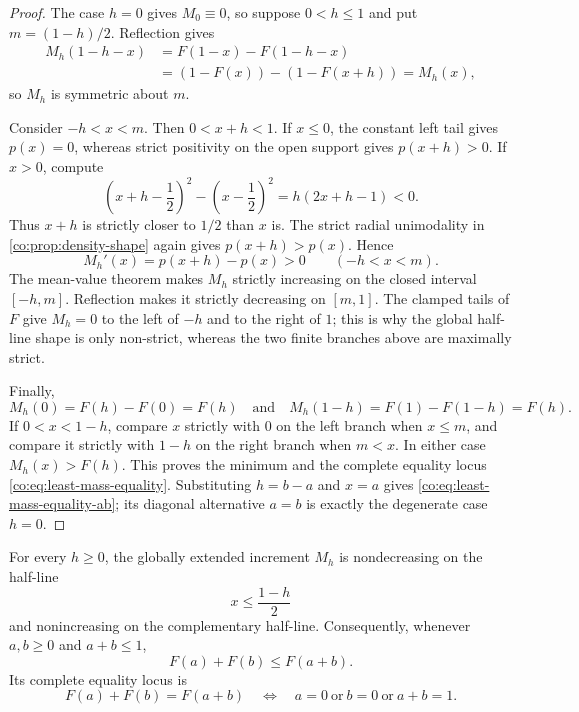 \begin{proof}
The case $h=0$ gives $M_0\equiv0$, so suppose $0<h\le1$ and put
$m=(1-h)/2$.  Reflection gives
\begin{align*}
 M_h(1-h-x)
 &=F(1-x)-F(1-h-x)\\
 &=(1-F(x))-(1-F(x+h))=M_h(x),
\end{align*}
so $M_h$ is symmetric about $m$.

Consider $-h<x<m$.  Then $0<x+h<1$.  If $x\le0$, the constant left tail gives
$p(x)=0$, whereas strict positivity on the open support gives $p(x+h)>0$.
If $x>0$, compute
\begin{equation}\label{co:eq:distance-comparison}
 \left(x+h-\frac12\right)^2-
 \left(x-\frac12\right)^2
 =h(2x+h-1)<0.
\end{equation}
Thus $x+h$ is strictly closer to $1/2$ than $x$ is.  The strict radial
unimodality in \cref{co:prop:density-shape} again gives $p(x+h)>p(x)$.  Hence
\begin{equation}\label{co:eq:M-derivative}
 M_h'(x)=p(x+h)-p(x)>0
 \qquad(-h<x<m).
\end{equation}
The mean-value theorem makes $M_h$ strictly increasing on the closed interval
$[-h,m]$.  Reflection makes it strictly decreasing on $[m,1]$.  The clamped
tails of $F$ give $M_h=0$ to the left of $-h$ and to the right of $1$; this is
why the global half-line shape is only non-strict, whereas the two finite
branches above are maximally strict.

Finally,
\[
 M_h(0)=F(h)-F(0)=F(h)
 \quad\text{and}\quad
 M_h(1-h)=F(1)-F(1-h)=F(h).
\]
If $0<x<1-h$, compare $x$ strictly with $0$ on the left branch when $x\le m$,
and compare it strictly with $1-h$ on the right branch when $m<x$.  In either
case $M_h(x)>F(h)$.  This proves the minimum and the complete equality locus
\eqref{co:eq:least-mass-equality}.  Substituting $h=b-a$ and $x=a$ gives
\eqref{co:eq:least-mass-equality-ab}; its diagonal alternative $a=b$ is exactly
the degenerate case $h=0$.
\end{proof}

\begin{corollary}
\label{co:cor:global-increment-shape}
For every $h\ge0$, the globally extended increment $M_h$ is nondecreasing on
the half-line
\[
 x\le\frac{1-h}{2}
\]
and nonincreasing on the complementary half-line.  Consequently, whenever
$a,b\ge0$ and $a+b\le1$,
\begin{equation}\label{co:eq:fabius-superadditive}
 F(a)+F(b)\le F(a+b).
\end{equation}
Its complete equality locus is
\begin{equation}\label{co:eq:fabius-superadditive-equality}
 F(a)+F(b)=F(a+b)
 \quad\Longleftrightarrow\quad
 a=0\ \text{or}\ b=0\ \text{or}\ a+b=1.
\end{equation}
\end{corollary}


